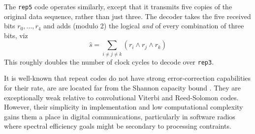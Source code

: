 The {\tt rep5} code operates similarly, except that it transmits five copies
of the original data sequence, rather than just three.
The decoder takes the five received bits $r_0,\ldots,r_4$ and adds (modulo
2) the logical {\it and} of every combination of three bits, viz
\[
    \hat{s} = \sum_{i\ne j \ne k} {(r_i \land r_j \land r_k)}
\]
This roughly doubles the number of clock cycles to decode over {\tt rep3}.

It is well-known that repeat codes do not have strong error-correction
capabilities for their rate, are are located far from the Shannon capacity
bound \cite{Proakis:2001}.
They are exceptionally weak relative to convolutional Viterbi and Reed-Solomon
codes.
However, their simplicity in implementation and low computational complexity
gains them a place in digital communications, particularly in software radios
where spectral efficiency goals might be secondary to processing contraints.

